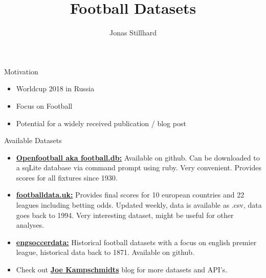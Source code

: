 \documentclass[10pt]{beamer}
\title{Football Datasets}
\date{}
\author{Jonas Stillhard}
\institute{Swiss Federal Research Institute WSL\\
\href{mailto:jonas.stillhard@wsl.ch}{jonas.stillhard@wsl.ch}}
\begin{document}
\maketitle



\begin{frame}[fragile]{Motivation}
   \begin{itemize}
        \item Worldcup 2018 in Russia
        \item Focus on Football
        \item Potential for a widely received publication / blog post 
      \end{itemize}
\end{frame}


\begin{frame}[fragile]{Available Datasets}

\begin{itemize}
\item \href{https://github.com/openfootball}{\textbf{Openfootball aka football.db:}} Available on github. Can be downloaded to a sqLite database via command prompt using ruby. Very convenient. Provides scores for all fixtures since 1930. 
\item \href{http://www.football-data.co.uk/data.php}{\textbf{footballdata.uk:}} Provides final scores for 10 european countries and 22 leagues including betting odds. Updated weekly, data is available as .csv, data goes back to 1994. Very interesting dataset, might be useful for other analyses. 
\item \href{https://github.com/jalapic/engsoccerdata}{\textbf{engsoccerdata:}} Historical football datasets with a focus on english premier league, historical data back to 1871. Available on github.
\item Check out
\href{https://www.jokecamp.com/blog/guide-to-football-and-soccer-data-and-apis/#openfootball}{\textbf{Joe Kampschmidts}} blog for more datasets and API's. 
\end{itemize}
\end{frame}
\end{document}

